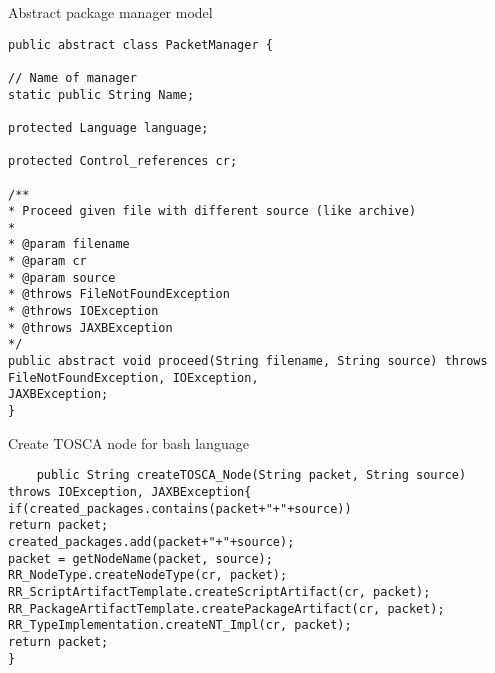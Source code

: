 \begin{Listing}
\caption{Abstract package manager model}
\label{lst:pmabst}
\begin{lstlisting}
public abstract class PacketManager {

// Name of manager
static public String Name;

protected Language language;

protected Control_references cr;

/**
* Proceed given file with different source (like archive)
* 
* @param filename
* @param cr
* @param source
* @throws FileNotFoundException
* @throws IOException
* @throws JAXBException
*/
public abstract void proceed(String filename, String source) throws FileNotFoundException, IOException,
JAXBException;
}
\end{lstlisting}
\end{Listing}

\begin{Listing}
\caption{Create TOSCA node for bash language}
\label{lst:create_bash}
\begin{lstlisting}
	public String createTOSCA_Node(String packet, String source) throws IOException, JAXBException{
if(created_packages.contains(packet+"+"+source))
return packet;
created_packages.add(packet+"+"+source);
packet = getNodeName(packet, source);
RR_NodeType.createNodeType(cr, packet);
RR_ScriptArtifactTemplate.createScriptArtifact(cr, packet);
RR_PackageArtifactTemplate.createPackageArtifact(cr, packet);
RR_TypeImplementation.createNT_Impl(cr, packet);
return packet;
}
\end{lstlisting}
\end{Listing}


